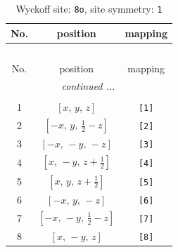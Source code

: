 \documentclass[fleqn,8pt]{jsarticle}
\begin{document}
\renewcommand{\arraystretch}{1.2}
\begin{longtable}{ccc}
\caption{Wyckoff site: {\tt 8o}, site symmetry: {\tt 1}}
 \\
 \hline \hline
No. & position & mapping \\ \hline \endfirsthead

\multicolumn{2}{l}{\tablename\ \thetable{}} \\
 \hline \hline
No. & position & mapping \\ \hline \endhead

 \hline \hline
\multicolumn{2}{r}{\footnotesize\it continued ...} \\ \endfoot

 \hline \hline
\multicolumn{2}{r}{} \\ \endlastfoot

1 & $\left[ x,\, y,\, z \right]$ & {\tt [1]} \\ \hline
2 & $\left[ - x,\, y,\, \frac{1}{2} - z \right]$ & {\tt [2]} \\ \hline
3 & $\left[ - x,\, - y,\, - z \right]$ & {\tt [3]} \\ \hline
4 & $\left[ x,\, - y,\, z + \frac{1}{2} \right]$ & {\tt [4]} \\ \hline
5 & $\left[ x,\, y,\, z + \frac{1}{2} \right]$ & {\tt [5]} \\ \hline
6 & $\left[ - x,\, y,\, - z \right]$ & {\tt [6]} \\ \hline
7 & $\left[ - x,\, - y,\, \frac{1}{2} - z \right]$ & {\tt [7]} \\ \hline
8 & $\left[ x,\, - y,\, z \right]$ & {\tt [8]} \\
\end{longtable}
\end{document}
